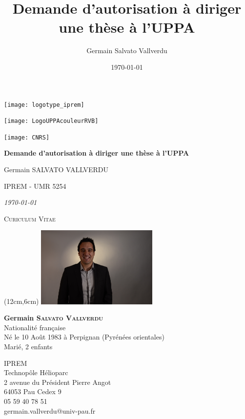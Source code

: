 \documentclass[11pt]{artuppax}
\title{Demande d'autorisation à diriger une thèse à l'UPPA}
\author{Germain Salvato Vallverdu}
\date{\today}
\renewcommand{\maketitle}{%
    \thispagestyle{titlepage}
    \singlespacing
    \begin{center}
        \parbox{.33\textwidth}{\texttt{[image: logotype\_iprem]}}
        \parbox{.33\textwidth}{\centering \texttt{[image: LogoUPPAcouleurRVB]}}
        \parbox{.33\textwidth}{\hfill\texttt{[image: CNRS]}}

        \vspace*{\stretch{1}}

        {\Huge\bfseries\setlength{\baselineskip}{1.2\baselineskip}%
        Demande d'autorisation à diriger une thèse à l'UPPA
        \par}

        \vspace{4ex}

        {\LARGE Germain SALVATO VALLVERDU}

        {\Large IPREM - UMR 5254}

        {\Large\itshape\today}

    \end{center}
    \vspace*{\stretch{1}}
    }
\begin{document}
%
%

\maketitle

\newpage
\setcounter{tocdepth}{1}
\tableofcontents

\newpage









\begin{center}
    \LARGE
    \textsc{Curiculum Vitae}
\end{center}
\vspace*{10mm}

	\begin{textblock*}{60mm}(12cm,6cm)
	    \includegraphics[height=4cm]{gvallver}
	\end{textblock*}


\textbf{\large Germain \textsc{Salvato Vallverdu}} \\
Nationalité française \\
Né le 10 Août 1983 à Perpignan (Pyrénées orientales) \\
Marié, 2 enfants


\faFlask{} IPREM\\
Technopôle Hélioparc\\
2 avenue du Président Pierre Angot\\
64053 Pau Cedex 9\\
\faPhone{} 05 59 40 78 51\\
\faAt{} germain.vallverdu@univ-pau.fr \par
\end{document}
